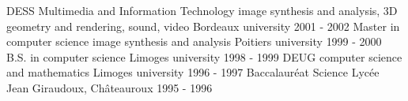 \begin{cvhonors}
  \cvhonor
    {DESS Multimedia and Information Technology}
    {\lastnewline image synthesis and analysis, 3D geometry and rendering,
    sound, video}
    {Bordeaux university}
    {2001 - 2002}
  \cvhonor
    {Master in computer science}
    {image synthesis and analysis}
    {Poitiers university}
    {1999 - 2000}
  \cvhonor
    {B.S. in computer science}
    {}
    {Limoges university}
    {1998 - 1999}
  \cvhonor
    {DEUG computer science and mathematics}
    {}
    {Limoges university}
    {1996 - 1997}
  \cvhonor
    {Baccalauréat Science}
    {}
    {Lycée Jean Giraudoux, Châteauroux}
    {1995 - 1996}
    {}
\end{cvhonors}
